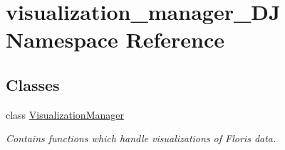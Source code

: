 \hypertarget{namespacevisualization__manager___d_j}{}\section{visualization\+\_\+manager\+\_\+\+DJ Namespace Reference}
\label{namespacevisualization__manager___d_j}
\subsection*{Classes}
\begin{DoxyCompactItemize}
\item 
class \mbox{\hyperlink{classvisualization__manager___d_j_1_1_visualization_manager}{Visualization\+Manager}}
\begin{DoxyCompactList}\small\item\em Contains functions which handle visualizations of Floris data. \end{DoxyCompactList}\end{DoxyCompactItemize}
